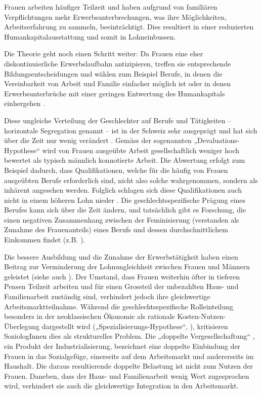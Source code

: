 \documentclass[a4paper,12pt]{article}
\renewcommand{\baselinestretch}{1.1}
\newif\ifcomments
\newcommand{\comment}[1]{%
    \ifcomments\marginpar{\renewcommand{\baselinestretch}{1}\tiny\hspace*{-1.1em}\colorbox{gray!20}%
    {\textcolor{red}{\parbox[t]{.9in}{\raggedright #1}}}}\fi}
\begin{document}
Frauen arbeiten häufiger Teilzeit und haben aufgrund von familiären Verpflichtungen mehr Erwerbsunterbrechungen, was ihre Möglichkeiten, Arbeitserfahrung zu sammeln, beeinträchtigt. Dies resultiert in einer reduzierten Humankapitalausstattung und somit in Lohneinbussen. 

Die Theorie geht noch einen Schritt weiter: Da Frauen eine eher
diskontinuierliche Erwerbslaufbahn antizipieren, treffen sie entsprechende
Bildungsentscheidungen und wählen zum Beispiel Berufe, in denen die
Vereinbarkeit von Arbeit und Familie einfacher möglich ist oder in denen
Erwerbsunterbrüche mit einer geringen Entwertung des Humankapitals einhergehen
\citep{Polachek-1981}.

\comment{diesen Abschnitt in den Theorieteil?}
Diese ungleiche Verteilung der Geschlechter auf Berufe und Tätigkeiten -- horizontale Segregation genannt -- ist in der Schweiz sehr ausgeprägt und hat sich über die Zeit nur wenig verändert \citep{Buchmann-Kriesi-2012,Charles-2005,Schwiter-etal-2014}.
Gemäss der sogenannten „Devaluations-Hypothese“
\citep{England-etal-1988,Liebeskind-2004} wird von Frauen ausgeübte Arbeit
gesellschaftlich weniger hoch bewertet als typisch männlich konnotierte Arbeit. Die
Abwertung erfolgt zum Beispiel dadurch, dass Qualifikationen, welche für die
häufig von Frauen ausgeübten Berufe erforderlich sind, nicht also solche
wahrgenommen, sondern als inhärent angesehen werden. Folglich schlagen sich
diese Qualifikationen auch nicht in einem höheren Lohn nieder
\citep{England-1992,England-2005,Gottschall-1995}. Die geschlechtsspezifische
Prägung eines Berufes kann sich über die Zeit ändern, und tatsächlich gibt es
Forschung, die einen negativen Zusammenhang zwischen der Feminisierung
(verstanden als Zunahme des Frauenanteils) eines Berufs und dessen
durchschnittlichem Einkommen findet (z.B.
\citealp{Levanon-etal-2009,Murphy-Oesch-2016}).

Die bessere Ausbildung und die Zunahme der Erwerbstätigkeit haben einen Beitrag
zur Verminderung der Lohnungleichheit zwischen Frauen und Männern geleistet
(siehe auch \citealp{Jann-Engelhardt-2008}). Der Umstand, dass Frauen weiterhin
öfter in tieferen Pensen Teilzeit arbeiten und für einen Grossteil der
unbezahlten Haus- und Familienarbeit zuständig sind, verhindert jedoch ihre
gleichwertige Arbeitsmarktteilnahme. Während die geschlechtsspezifische
Rolleinteilung besonders in der neoklassischen Ökonomie als rationale
Kosten-Nutzen-Überlegung dargestellt wird („Spezialisierungs-Hypothese“,
\citealp{Becker-1981}), kritisieren SoziologInnen dies als strukturelles
Problem. Die „doppelte Vergesellschaftung“ \citep{Becker-Schmidt-2008}, ein
Produkt der Industrialisierung, bezeichnet eine doppelte Einbindung der Frauen
in das Sozialgefüge, einerseits auf dem Arbeitsmarkt und andererseits im
Haushalt. Die daraus resultierende doppelte Belastung ist nicht zum Nutzen der
Frauen. Daneben, dass der Haus- und Familienarbeit wenig Wert zugesprochen
wird, verhindert sie auch die gleichwertige Integration in den Arbeitsmarkt.
\end{document}
